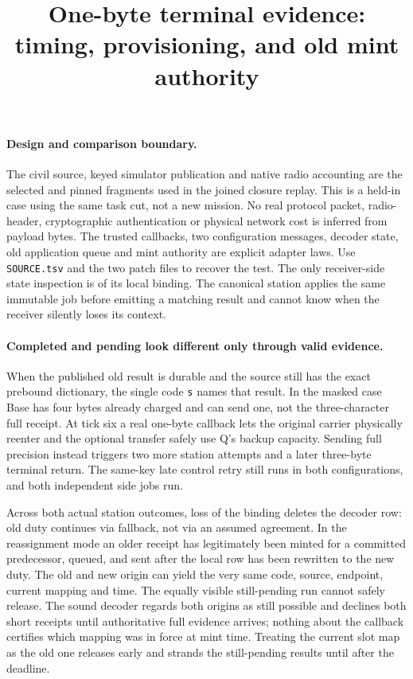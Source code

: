\documentclass{article}
\title{One-byte terminal evidence: timing, provisioning, and old mint authority}
\date{}
\begin{document}
\maketitle

\paragraph{Design and comparison boundary.}
The civil source, keyed simulator publication and native radio
accounting are the selected and pinned fragments used in the joined
closure replay. This is a held-in case using the same task cut, not
a new mission. No real protocol packet, radio-header, cryptographic
authentication or physical network cost is inferred from payload bytes.
The trusted callbacks, two configuration messages, decoder state,
old application queue and mint authority are explicit adapter laws.
Use \verb|SOURCE.tsv| and the two patch files to recover the test.
The only receiver-side state inspection is of its local binding.
The canonical station applies the same immutable job before emitting
a matching result and cannot know when the receiver silently loses
its context.

\paragraph{Completed and pending look different only through valid evidence.}
When the published old result is durable and the source still has
the exact prebound dictionary, the single code \texttt{s} names that
result. In the masked case Base has four bytes already charged and
can send one, not the three-character full receipt. At tick six a
real one-byte callback lets the original carrier physically reenter
and the optional transfer safely use Q's backup capacity. Sending
full precision instead triggers two more station attempts and a
later three-byte terminal return. The same-key late control retry
still runs in both configurations, and both independent side jobs run.

Across both actual station outcomes, loss of the binding deletes the
decoder row: old duty continues via fallback, not via an assumed
agreement. In the reassignment mode an older receipt has legitimately
been minted for a committed predecessor, queued, and sent after the
local row has been rewritten to the new duty. The old and new origin
can yield the very same code, source, endpoint, current mapping and
time. The equally visible still-pending run cannot safely release.
The sound decoder regards both origins as still possible and declines
both short receipts until authoritative full evidence arrives; nothing
about the callback certifies which mapping was in force at mint time.
Treating the current slot map as the old one releases early and
strands the still-pending results until after the deadline.
\end{document}
